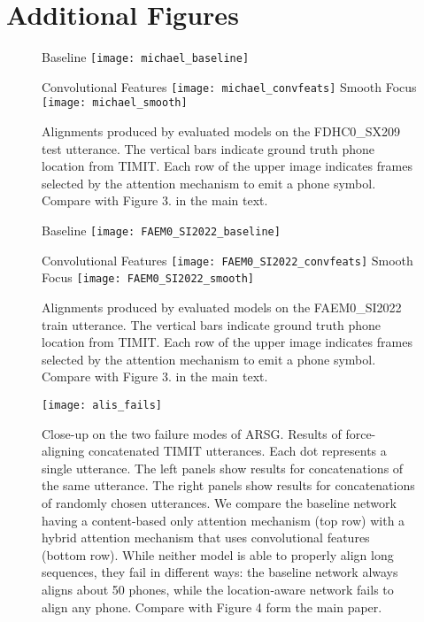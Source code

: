 \section{Additional Figures}

\begin{figure}[h]
  \centering
  Baseline
  \texttt{[image: michael\_baseline]}

  Convolutional Features
  \texttt{[image: michael\_convfeats]}
  Smooth Focus
  \texttt{[image: michael\_smooth]}
  \caption{Alignments
      produced by evaluated models on the FDHC0\_SX209 test utterance. The vertical bars
      indicate ground truth phone location from TIMIT. Each
      row of the upper image indicates frames selected by
      the attention mechanism to emit a phone symbol. Compare with
      Figure 3. in the main text.
  }  

  \vspace{-4mm}
\end{figure}

\begin{figure}[h]
  \centering
  Baseline
  \texttt{[image: FAEM0\_SI2022\_baseline]}

  Convolutional Features
  \texttt{[image: FAEM0\_SI2022\_convfeats]}
  Smooth Focus
  \texttt{[image: FAEM0\_SI2022\_smooth]}
  \caption{Alignments
      produced by evaluated models on the FAEM0\_SI2022 train utterance. The vertical bars
      indicate ground truth phone location from TIMIT. Each
      row of the upper image indicates frames selected by
      the attention mechanism to emit a phone symbol. Compare with
      Figure 3. in the main text.
  }  

  \vspace{-4mm}
\end{figure}



\begin{figure}[h]
  \centering
  \texttt{[image: alis\_fails]}
  \caption[Results of force-aligning of long utterances.]{Close-up on
    the two failure modes of ARSG. Results of
    force-aligning concatenated TIMIT utterances. Each dot represents
    a single utterance. The left panels show results for
    concatenations of the same utterance. The right panels show
    results for concatenations of randomly chosen utterances. We
    compare the baseline network having a content-based only attention
    mechanism (top row) with a hybrid attention mechanism that uses
    convolutional features (bottom row). While neither model is able
    to properly align long sequences, they fail in different ways: the
    baseline network always aligns about 50 phones, while the
    location-aware network fails to align any phone. Compare with
    Figure 4 form the main paper.}
\end{figure}

